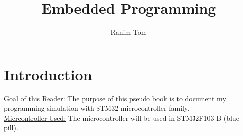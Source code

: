 \documentclass[12pt,a4paper]{book}
\title{Embedded Programming}
\author{Ranim Tom}
\begin{document}
% 



\maketitle

\tableofcontents



\printnomenclature




\listoftodos


\pagestyle{fancy}
\fancyhf{} %
\rhead{\rightmark}



\chapter{Introduction}

\underline{Goal of this Reader:} The purpose of this pseudo book is to document my programming simulation with STM32 microcontroller family.\\

\underline{Micrcontroller Used:} 
The microcontroller will be used in STM32F103 B (blue pill).











\end{document}
